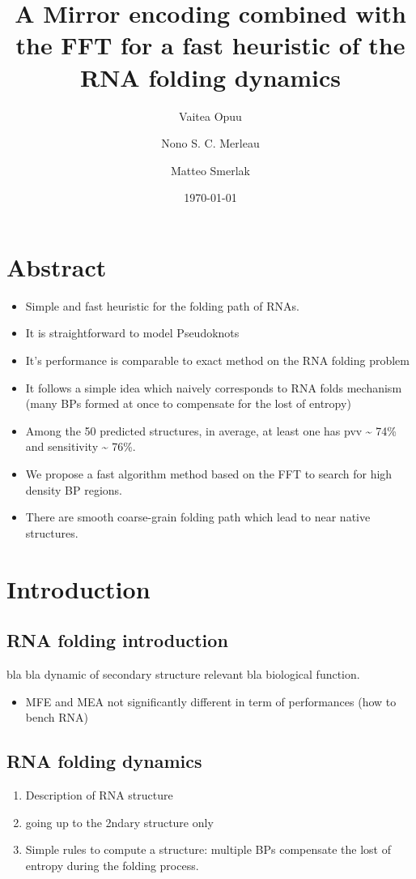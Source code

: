 \documentclass[a4paper,12pt]{article}
\author[1]{Vaitea Opuu}
\author[1]{Nono S. C. Merleau}
\author[1]{Matteo Smerlak}
\affil[1]{Max Planck Institute for Mathematics in the Sciences, D-04103 Leipzig, Germany}
\date{\today}
\title{A Mirror encoding combined with the FFT for a fast heuristic of the RNA folding dynamics}
\begin{document}
\maketitle

\section{Abstract}
\label{sec:org1da457b}
\begin{itemize}
\item Simple and fast heuristic for the folding path of RNAs.
\item It is straightforward to model Pseudoknots
\item It's performance is comparable to exact method on the RNA folding problem
\item It follows a simple idea which naively corresponds to RNA folds mechanism
(many BPs formed at once to compensate for the lost of entropy)
\item Among the 50 predicted structures, in average, at least one has pvv \textasciitilde{} 74\% and
sensitivity \textasciitilde{} 76\%.
\item We propose a fast algorithm method based on the FFT to search for high density
BP regions.
\item There are smooth coarse-grain folding path which lead to near native structures.
\end{itemize}

\clearpage
\section{Introduction}
\label{sec:orgd78e655}
\subsection{RNA folding introduction}
\label{sec:org46c0b3b}
bla bla dynamic of secondary structure relevant bla biological function.

\begin{itemize}
\item MFE and MEA not significantly different in term of performances (how to bench RNA)
\end{itemize}

\subsection{RNA folding dynamics}
\label{sec:org1e69860}
\begin{enumerate}
\item Description of RNA structure
\item going up to the 2ndary structure only
\item Simple rules to compute a structure: multiple BPs compensate the lost of
entropy during the folding process.
\end{enumerate}
\end{document}
